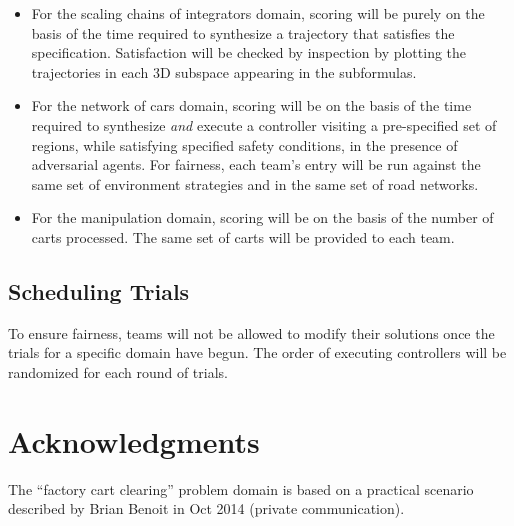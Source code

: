 \documentclass{amsart}
\theoremstyle{definition}
\begin{document}
\begin{itemize}
\item For the scaling chains of integrators domain, scoring will be purely on the basis of the time required to synthesize a trajectory that 
satisfies the specification. Satisfaction will be checked by inspection by plotting the trajectories in each 3D subspace appearing in the
subformulas.
\item For the network of cars domain, scoring will be on the basis of the time required to synthesize \emph{and} execute a controller
visiting a pre-specified set of regions, while satisfying specified safety conditions, in the presence of adversarial agents. For fairness, 
each team's entry will be run against the same set of environment strategies and in the same set of road networks.
\item For the manipulation domain, scoring will be on the basis of the number of carts processed. The same set of carts will be provided 
to each team.
\end{itemize}


\subsection{Scheduling Trials}
To ensure fairness, teams will not be allowed to modify their solutions once the trials for a specific domain have begun. The order of executing
controllers will be randomized for each round of trials.

\section*{Acknowledgments}

The ``factory cart clearing'' problem domain is based on a practical scenario
described by Brian Benoit in Oct 2014 (private communication).




\end{document}
